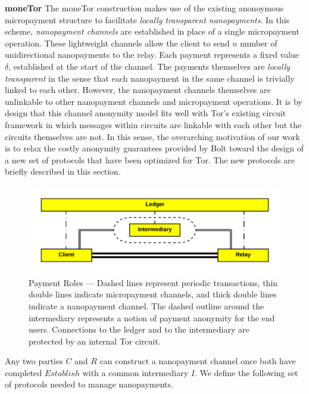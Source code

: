 \textbf{moneTor} The moneTor construction makes use of the existing anonoymous
micropayment structure to facilitate \emph{locally transparent nanopayments}. In
this scheme, \emph{nanopayment channels} are established in place of a single
micropayment operation. These lightweight channels allow the client to send $n$
number of unidirectional nanopayments to the relay. Each payment represents a
fixed value $\delta$, established at the start of the channel. The payments
themselves are \emph{locally transparent} in the sense that each nanopayment in
the same channel is trivially linked to each other. However, the nanopayment
channels themselves are unlinkable to other nanopayment channels and
micropayment operations. It is by design that this channel anonymity model fits
well with Tor's existing circuit framework in which messages within circuits are
linkable with each other but the circuits themselves are not. In this sense, the
overarching motivation of our work is to relax the costly anonymity guarantees
provided by Bolt toward the design of a new set of protocols that have been
optimized for Tor. The new protocols are briefly described in this section.

\begin{figure}[h] \centering
  \includegraphics[trim={0.5cm, 0.5cm, 0.5cm, 0.5cm}, clip, scale=0.6]{images/party_diagram.png}
  \caption[Payment Roles]{Payment Roles --- Dashed lines represent periodic
    transactions, thin double lines indicate micropayment channels, and thick
    double lines indicate a nanopayment channel. The dashed outline around the
    intermediary represents a notion of payment anonymity for the end users. Connections to the ledger and to the intermediary are protected by an internal Tor circuit.}
  \label{fig:parties}
\end{figure}
Any two parties $C$ and $R$ can construct a nanopayment channel once both have
completed $Establish$ with a common intermediary $I$. We define the following
set of protocols needed to manage nanopayments.


